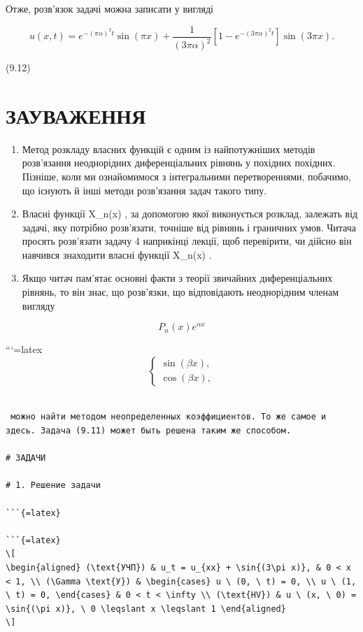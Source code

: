 \documentclass[
  ukrainian,
]{article}
\begin{document}
Отже, розв'язок задачі можна записати у вигляді

\[
u(x, t) = e^{-(\pi\alpha)^2 t} \sin(\pi x) + \frac{1}{(3\pi\alpha)^2} [1 - e^{-(3\pi\alpha)^2 t}] \sin(3\pi x).
\]

(9.12)

\section{ЗАУВАЖЕННЯ}\label{ux437ux430ux443ux432ux430ux436ux435ux43dux43dux44f}

\begin{enumerate}
\def\labelenumi{\arabic{enumi}.}
\item
  Метод розкладу власних функцій є одним із найпотужніших методів
  розв'язання неоднорідних диференціальних рівнянь у похідних похідних.
  Пізніше, коли ми ознайомимося з інтегральними перетвореннями,
  побачимо, що існують й інші методи розв'язання задач такого типу.
\item
  Власні функції X\_n(x) , за допомогою якої виконується розклад,
  залежать від задачі, яку потрібно розв'язати, точніше від рівнянь і
  граничних умов. Читача просять розв'язати задачу 4 наприкінці лекції,
  щоб перевірити, чи дійсно він навчився знаходити власні функції
  X\_n(x) .
\item
  Якщо читач пам'ятає основні факти з теорії звичайних диференціальних
  рівнянь, то він знає, що розв'язки, що відповідають неоднорідним
  членам вигляду
\end{enumerate}

\[
P_n(x) e^{\alpha x}
\]

```{=latex}
\[
\begin{cases} \sin{(\beta x)}, \\ \cos{(\beta x)}, \end{cases}
\]

\begin{verbatim}

 можно найти методом неопределенных коэффициентов. То же самое и здесь. Задача (9.11) может быть решена таким же способом.

# ЗАДАЧИ

# 1. Решение задачи

```{=latex}

```{=latex}
\[
\begin{aligned} (\text{УЧП}) & u_t = u_{xx} + \sin{(3\pi x)}, & 0 < x < 1, \\ (\Gamma \text{У}) & \begin{cases} u \ (0, \ t) = 0, \\ u \ (1, \ t) = 0, \end{cases} & 0 < t < \infty \\ (\text{HV}) & u \ (x, \ 0) = \sin{(\pi x)}, \ 0 \leqslant x \leqslant 1 \end{aligned}
\]
\end{verbatim}
\end{document}
